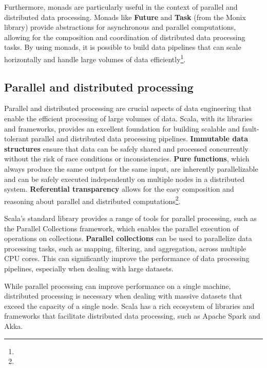 Furthermore, monads are particularly useful in the context of parallel and distributed data processing. Monads like \textbf{Future} and \textbf{Task} (from the Monix library) provide abstractions for asynchronous and parallel computations, allowing for the composition and coordination of distributed data processing tasks. By using monads, it is possible to build data pipelines that can scale horizontally and handle large volumes of data efficiently\footnote[4]{}.

\subsection{Parallel and distributed processing}

Parallel and distributed processing are crucial aspects of data engineering that enable the efficient processing of large volumes of data. Scala, with its libraries and frameworks, provides an excellent foundation for building scalable and fault-tolerant parallel and distributed data processing pipelines. \textbf{Immutable data structures} ensure that data can be safely shared and processed concurrently without the risk of race conditions or inconsistencies. \textbf{Pure functions}, which always produce the same output for the same input, are inherently parallelizable and can be safely executed independently on multiple nodes in a distributed system. \textbf{Referential transparency} allows for the easy composition and reasoning about parallel and distributed computations\footnote[10]{}.

Scala's standard library provides a range of tools for parallel processing, such as the Parallel Collections framework, which enables the parallel execution of operations on collections. \textbf{Parallel collections} can be used to parallelize data processing tasks, such as mapping, filtering, and aggregation, across multiple CPU cores. This can significantly improve the performance of data processing pipelines, especially when dealing with large datasets\footnotemark[10].



While parallel processing can improve performance on a single machine, distributed processing is necessary when dealing with massive datasets that exceed the capacity of a single node. Scala has a rich ecosystem of libraries and frameworks that facilitate distributed data processing, such as Apache Spark and Akka\footnotemark[10].

